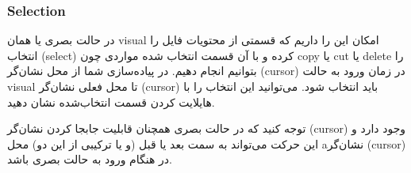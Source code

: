 \subsubsection*{{\titr Selection}}


در حالت بصری یا همان visual امکان این را داریم که قسمتی از محتویات فایل را انتخاب (select) کرده و با آن قسمت انتخاب شده مواردی چون copy یا cut یا delete را بتوانیم انجام دهیم.
در پیاده‌سازی شما از محل نشان‌گر (cursor) در زمان ورود به حالت visual تا محل فعلی نشان‌گر (cursor) باید انتخاب شود. می‌توانید این انتخاب را با هایلایت کردن قسمت انتخاب‌شده نشان دهید.

توجه کنید که در حالت بصری همچنان قابلیت جابجا کردن نشان‌گر (cursor) وجود دارد و این حرکت می‌تواند به سمت بعد یا قبل (و یا ترکیبی از این دو) محل aنشان‌گر (cursor) در هنگام ورود به حالت بصری باشد.
